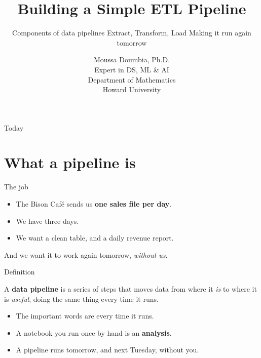 \documentclass[aspectratio=169,10pt]{beamer}
\title{Building a Simple ETL Pipeline}
\subtitle{Components of data pipelines \textperiodcentered{} Extract, Transform, Load
          \textperiodcentered{} Making it run again tomorrow}
\date{}
\author{Moussa Doumbia, Ph.D.\\[2pt]
        {\small Expert in DS, ML \& AI}\\[1pt]
        {\small Department of Mathematics}\\[1pt]
        {\small Howard University}}
\institute{MATH 153 \textemdash{} Data Wrangling / Data Engineering}
\begin{document}
\maketitle

\begin{frame}{Today}
  \hypertarget{toc}{}%
  \tableofcontents
\end{frame}

\section{What a pipeline is}

\begin{frame}{The job}
  \begin{itemize}[<+->]
    \item The Bison Caf\'e sends us \textbf{one sales file per day}.
    \item We have three days.
    \item We want a clean table, and a daily revenue report.
  \end{itemize}

  \pause\vfill
  \begin{aside}
    \small
    And we want it to work again tomorrow, \emph{without us}.
  \end{aside}
\end{frame}

\begin{frame}{Definition}
  \begin{defn}
    A \textbf{data pipeline} is a series of steps that moves data from where it \emph{is} to where it
    is \emph{useful}, doing the same thing every time it runs.
  \end{defn}

  \pause
  \begin{itemize}[<+->]
    \item The important words are \alert{every time it runs}.
    \item A notebook you run once by hand is an \textbf{analysis}.
    \item A pipeline runs tomorrow, and next Tuesday, without you.
  \end{itemize}
\end{frame}
\end{document}
